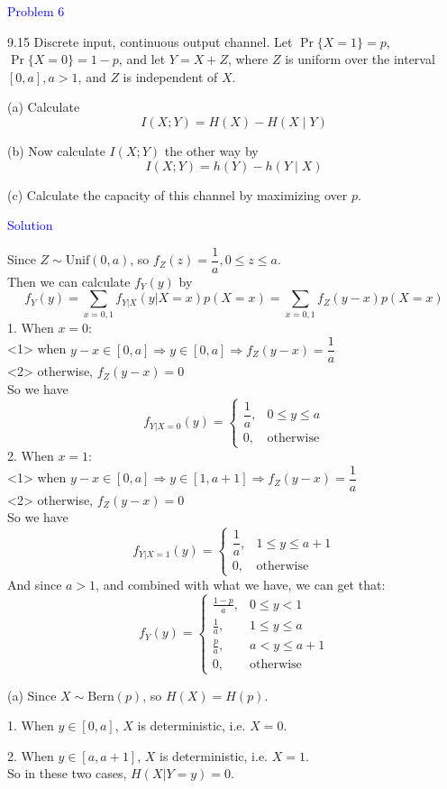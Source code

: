 \textcolor{blue}{Problem 6}

9.15 Discrete input, continuous output channel. Let $\operatorname{Pr}\{X=1\}=p$, $\operatorname{Pr}\{X=0\}=1-p$, and let $Y=X+Z$, where $Z$ is uniform over the interval $[0, a], a>1$, and $Z$ is independent of $X$.

(a) Calculate $$I(X ; Y)=H(X)-H(X \mid Y)$$

(b) Now calculate $I(X ; Y)$ the other way by $$I(X ; Y)=h(Y)-h(Y \mid X)$$

(c) Calculate the capacity of this channel by maximizing over $p$.

\textcolor{blue}{Solution}

Since $Z\sim\text{Unif}(0,a)$, so $f_Z(z)=\dfrac{1}{a}, 0\leq z\leq a$. \\
Then we can calculate $f_Y(y)$ by
$$f_Y(y)=\sum_{x=0,1}f_{Y|X}(y|X=x)p(X=x)=\sum_{x=0,1}f_{Z}(y-x)p(X=x)$$
1. When $x=0$: \\
<1> when $y-x\in[0,a]\Rightarrow y\in[0,a]\Rightarrow f_Z(y-x)=\dfrac{1}{a}$ \\
<2> otherwise, $f_Z(y-x)=0$ \\
So we have
$$f_{Y|X=0}(y)=\begin{cases}
\dfrac{1}{a}, & 0\leq y\leq a \\
0, & \text{otherwise}
\end{cases}$$
2. When $x=1$: \\
<1> when $y-x\in[0,a]\Rightarrow y\in[1,a+1]\Rightarrow f_Z(y-x)=\dfrac{1}{a}$ \\
<2> otherwise, $f_Z(y-x)=0$ \\
So we have
$$f_{Y|X=1}(y)=\begin{cases}
\dfrac{1}{a}, & 1\leq y\leq a+1 \\
0, & \text{otherwise}
\end{cases}$$
And since $a>1$, and combined with what we have, we can get that:
$$f_Y(y)=\begin{cases}
\frac{1-p}{a}, & 0\leq y< 1 \\
\frac{1}{a}, & 1\leq y\leq a \\
\frac{p}{a}, & a< y\leq a+1 \\
0, & \text{otherwise}
\end{cases}$$

(a) Since $X\sim\text{Bern}(p)$, so $H(X)=H(p)$.

1. When $y\in[0,a]$, $X$ is deterministic, i.e. $X=0$.

2. When $y\in[a,a+1]$, $X$ is deterministic, i.e. $X=1$. \\
So in these two cases, $H(X|Y=y)=0$.


